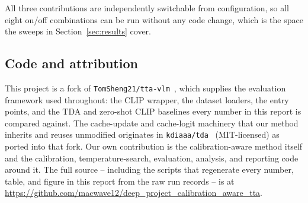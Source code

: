 All three contributions are independently switchable from configuration, so all eight on/off
combinations can be run without any code change, which is the space the sweeps in
Section~\ref{sec:results} cover.

\subsection{Code and attribution}

This project is a fork of \texttt{TomSheng21/tta-vlm}~\cite{tta-vlm-repo}, which supplies the
evaluation framework used throughout: the CLIP wrapper, the dataset loaders, the entry points,
and the TDA and zero-shot CLIP baselines every number in this report is compared
against. The cache-update and cache-logit machinery that our method inherits and reuses
unmodified originates in \texttt{kdiaaa/tda}~\cite{tda-repo} (MIT-licensed) as ported into that
fork. Our own contribution is the calibration-aware method itself and the calibration,
temperature-search, evaluation, analysis, and reporting code around it. The full source --
including the scripts that regenerate every number, table, and figure in this report from the
raw run records -- is at
\url{https://github.com/macwave12/deep_project_calibration_aware_tta}.
